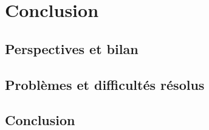 \section{Conclusion}

\subsection{Perspectives et bilan}

\subsection{Problèmes et difficultés résolus}

\subsection{Conclusion}
